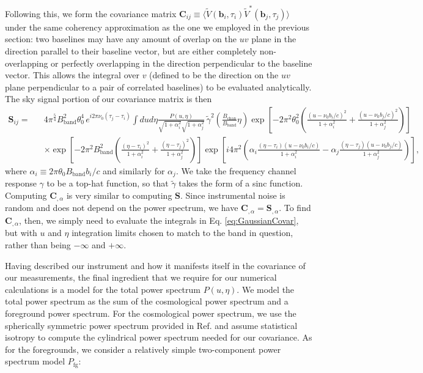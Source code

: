 \documentclass[twocolumn,aps,prd,nofootinbib,showpacs]{revtex4-1}
\begin{document}
\begin{widetext}
Following this, we form the covariance matrix $\mathbf{C}_{ij} \equiv \langle \widetilde{V} (\mathbf{b}_i, \tau_i) \widetilde{V}^* (\mathbf{b}_j, \tau_j) \rangle$ under the same coherency approximation as the one we employed in the previous section: two baselines may have any amount of overlap on the $uv$ plane in the direction parallel to their baseline vector, but are either completely non-overlapping or perfectly overlapping in the direction perpendicular to the baseline vector.  This allows the integral over $v$ (defined to be the direction on the $uv$ plane perpendicular to a pair of correlated baselines) to be evaluated analytically.  The sky signal portion of our covariance matrix is then
\begin{eqnarray}
\label{eq:GaussianCovar}
\mathbf{S}_{ij} = && 4 \pi^\frac{5}{4} B_\textrm{band}^2 \theta_0^4 \, e^{i 2 \pi \nu_0 (\tau_j - \tau_i)} \int du d\eta \frac{P(u,\eta) }{\sqrt{1+ \alpha_i^2} \sqrt{1+ \alpha_j^2}} \,\widetilde{\gamma}^2 \!\left( \frac{B_\textrm{chan}}{B_\textrm{band} } \eta \right) \exp \left[ - 2 \pi^2 \theta_0^2 \left( \frac{\left(u - \nu_0 b_i / c\right)^2}{1+ \alpha_i^2} + \frac{\left(u - \nu_0 b_j / c\right)^2}{1+ \alpha_j^2} \right)\right] \nonumber \\
&& \times \exp \left[ - 2 \pi^2 B_\textrm{band}^2 \left( \frac{\left( \eta - \tau_i \right)^2}{1+ \alpha_i^2} + \frac{\left( \eta - \tau_j \right)^2}{1+ \alpha_j^2} \right)\right] \exp \left[ i 4 \pi^2 \left( \alpha_i  \frac{\left( \eta - \tau_i \right)  \left(u - \nu_0 b_i / c\right) }{1+ \alpha_i^2} - \alpha_j  \frac{\left( \eta - \tau_j \right)  \left(u - \nu_0 b_j / c\right)}{1+ \alpha_j^2} \right)\right], \qquad 
\end{eqnarray}
where $\alpha_i \equiv 2\pi \theta_0 B_\textrm{band} b_i / c$ and similarly for $\alpha_j$.  We take the frequency channel response $\gamma$ to be a top-hat function, so that $\widetilde{\gamma}$ takes the form of a sinc function.  Computing $\mathbf{C}_{,\alpha}$ is very similar to computing $\mathbf{S}$.  Since instrumental noise is random and does not depend on the power spectrum, we have $\mathbf{C}_{,\alpha} = \mathbf{S}_{,\alpha}$.  To find $\mathbf{C}_{,\alpha}$, then, we simply need to evaluate the integrals in Eq. \eqref{eq:GaussianCovar}, but with $u$ and $\eta$ integration limits chosen to match to the band in question, rather than being $-\infty$ and $+\infty$.
\end{widetext}
Having described our instrument and how it manifests itself in the covariance of our measurements, the final ingredient that we require for our numerical calculations is a model for the total power spectrum $P(u,\eta)$.  We model the total power spectrum as the sum of the cosmological power spectrum and a foreground power spectrum.  For the cosmological power spectrum, we use the spherically symmetric power spectrum provided in Ref. \cite{Barkana2009} and assume statistical isotropy to compute the cylindrical power spectrum needed for our covariance.  As for the foregrounds, we consider a relatively simple two-component power spectrum model $P_\textrm{fg}$:
\end{document}

